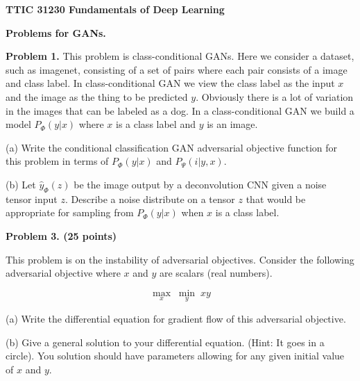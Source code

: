 \documentclass{article}
\newcommand{\solution}[1]{}
\begin{document}
\centerline{\bf TTIC 31230 Fundamentals of Deep Learning}

\bigskip

\centerline{\bf Problems for GANs.}

\bigskip
\bigskip
{\bf Problem 1.} This problem is class-conditional GANs.  Here we consider a dataset, such as imagenet, consisting of a set of pairs where each pair
consists of a image and class label.  In class-conditional GAN we view the class label as the input $x$ and the image as the thing to be predicted $y$.
Obviously there is a lot of variation in the images that can be labeled as a dog.  In a class-conditional GAN we build a model $P_\Phi(y|x)$ where $x$ is a class
label and $y$ is an image.

\medskip
(a) Write the conditional classification GAN adversarial objective function for this problem in terms of $P_\Phi(y|x)$ and $P_\Psi(i|y,x)$.

\medskip
(b) Let $\hat{y}_\Phi(z)$ be the image output by a deconvolution CNN given a noise tensor input $z$.  Describe a noise distribute on a
tensor $z$ that would be appropriate for
sampling from $P_\Phi(y|x)$ when $x$ is a class label.

\bigskip
{\bf Problem 3. (25 points)}

This problem is on the instability of adversarial objectives.
Consider the following adversarial objective where $x$ and $y$ are scalars (real numbers).

$$\max_x\;\min_y \;xy$$

\medskip
(a) Write the differential equation for gradient flow of this adversarial objective.

\solution{
  \begin{eqnarray*}
    \frac{dx}{dt} & = & y \\
    \\
    \frac{dy}{dt} & = & -x
  \end{eqnarray*}
}

      
\medskip
(b) Give a general solution to your differential equation. (Hint: It goes in a circle).  You solution should have parameters
allowing for any given initial value of $x$ and $y$.

\solution{

  \begin{eqnarray*}
    x & = & r_0\sin(t + \Theta_0) \\
    \\
    y & = & r_0\cos(t + \Theta_0)
  \end{eqnarray*}
}
\end{document}
